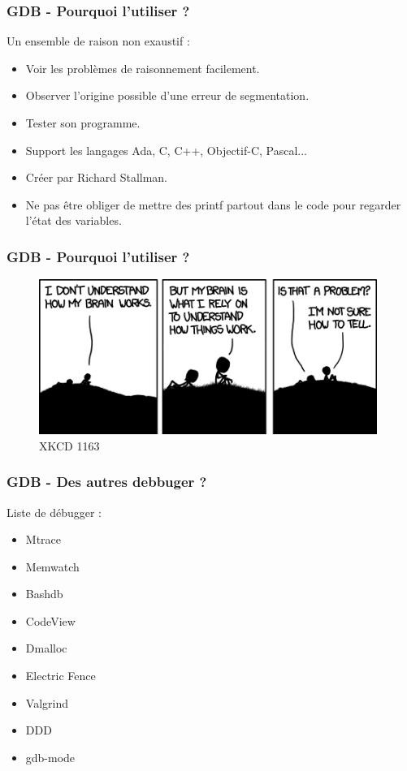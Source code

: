 \documentclass[8pt]{beamer}
\begin{document}
\begin{frame}
\frametitle{GDB - Pourquoi l'utiliser ?}

Un ensemble de raison non exaustif :
\begin{itemize}
	\item Voir les problèmes de raisonnement facilement.
	\onslide<3->\item Observer l'origine possible d'une erreur de segmentation.
	\onslide<4->\item Tester son programme.
	\onslide<5->\item Support les langages Ada, C, C++, Objectif-C, Pascal...
	\onslide<6->\item Créer par Richard Stallman.
	\onslide<7->\item Ne pas être obliger de mettre des printf partout dans le code pour regarder l'état des variables.
\end{itemize}
\end{frame}


\begin{frame}
\frametitle{GDB - Pourquoi l'utiliser ?} 

\begin{figure}[]
	\centering
	\includegraphics[width=11cm]{./images/debugger.png}
	\caption{XKCD 1163}
	\label{fig:figure1}
\end{figure}

\end{frame}

\begin{frame}
\frametitle{GDB - Des autres debbuger ?}

Liste de débugger :
\begin{itemize}
	\item Mtrace
	\onslide<3->\item Memwatch
	\onslide<4->\item Bashdb
	\onslide<5->\item CodeView
	\onslide<6->\item Dmalloc
	\onslide<7->\item Electric Fence
	\onslide<8->\item Valgrind
	\onslide<9->\item DDD
	\onslide<10->\item gdb-mode
\end{itemize}

\end{frame}
\end{document}
